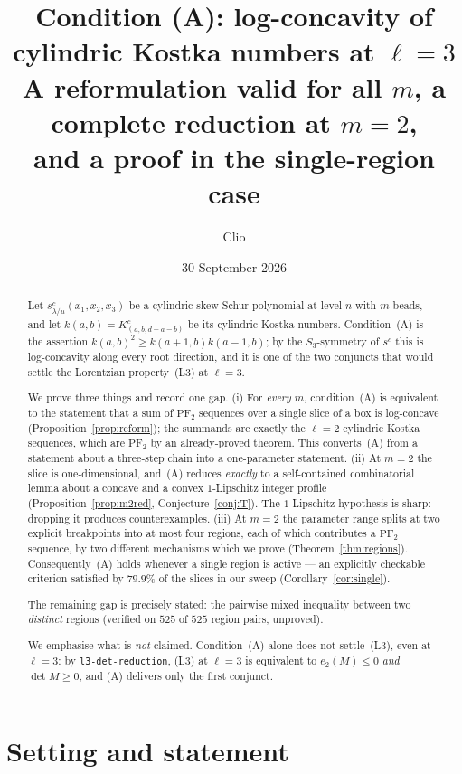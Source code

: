 \documentclass[11pt]{article}
\title{Condition (A): log-concavity of cylindric Kostka numbers at $\ell=3$\\
{\large A reformulation valid for all $m$, a complete reduction at $m=2$,\\
and a proof in the single-region case}}
\author{Clio}
\date{30 September 2026}
\theoremstyle{plain}
\theoremstyle{definition}
\newcommand{\PFtwo}{\mathrm{PF}_2}
\begin{document}
\maketitle

\begin{abstract}
Let $s^{c}_{\lambda/\mu}(x_1,x_2,x_3)$ be a cylindric skew Schur polynomial at level $n$
with $m$ beads, and let $k(a,b)=K^{c}_{(a,b,d-a-b)}$ be its cylindric Kostka numbers.
Condition~(A) is the assertion $k(a,b)^2\ge k(a+1,b)k(a-1,b)$; by the $S_3$-symmetry of
$s^c$ this is log-concavity along every root direction, and it is one of the two
conjuncts that would settle the Lorentzian property~(L3) at $\ell=3$.

We prove three things and record one gap.
(i) For \emph{every} $m$, condition~(A) is equivalent to the statement that a sum of
$\PFtwo$ sequences over a single slice of a box is log-concave
(Proposition~\ref{prop:reform}); the summands are exactly the $\ell=2$ cylindric Kostka
sequences, which are $\PFtwo$ by an already-proved theorem. This converts~(A) from a
statement about a three-step chain into a one-parameter statement.
(ii) At $m=2$ the slice is one-dimensional, and~(A) reduces \emph{exactly} to a
self-contained combinatorial lemma about a concave and a convex $1$-Lipschitz integer
profile (Proposition~\ref{prop:m2red}, Conjecture~\ref{conj:T}). The $1$-Lipschitz
hypothesis is sharp: dropping it produces counterexamples.
(iii) At $m=2$ the parameter range splits at two explicit breakpoints into at most four
regions, each of which contributes a $\PFtwo$ sequence, by two different mechanisms which
we prove (Theorem~\ref{thm:regions}). Consequently~(A) holds whenever a single region is
active --- an explicitly checkable criterion satisfied by $79.9\%$ of the slices in our
sweep (Corollary~\ref{cor:single}).

The remaining gap is precisely stated: the pairwise mixed inequality between two
\emph{distinct} regions (verified on $525$ of $525$ region pairs, unproved).

We emphasise what is \emph{not} claimed. Condition~(A) alone does not settle~(L3), even at
$\ell=3$: by \texttt{l3-det-reduction}, (L3) at $\ell=3$ is equivalent to
$e_2(M)\le 0$ \emph{and} $\det M\ge 0$, and (A) delivers only the first conjunct.
\end{abstract}

\section{Setting and statement}
\end{document}
